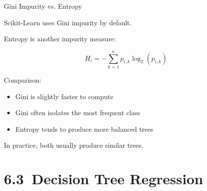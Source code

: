 \documentclass[aspectratio=169]{beamer}
\begin{document}

\begin{frame}{Gini Impurity vs. Entropy}
	
	Scikit-Learn uses Gini impurity by default.
	
	\vspace{0.5em}
	
	Entropy is another impurity measure:
	
	\[
	H_i
	=
	-
	\sum_{k=1}^{n}
	p_{i,k}\log_2(p_{i,k})
	\]
	
	\vspace{0.5em}
	
	Comparison:
	
	\begin{itemize}
		\item Gini is slightly faster to compute
		\item Gini often isolates the most frequent class
		\item Entropy tends to produce more balanced trees
	\end{itemize}
	
	\vspace{0.5em}
	
	In practice, both usually produce similar trees.
	
\end{frame}


\section{6.3~Decision Tree Regression}
\end{document}
